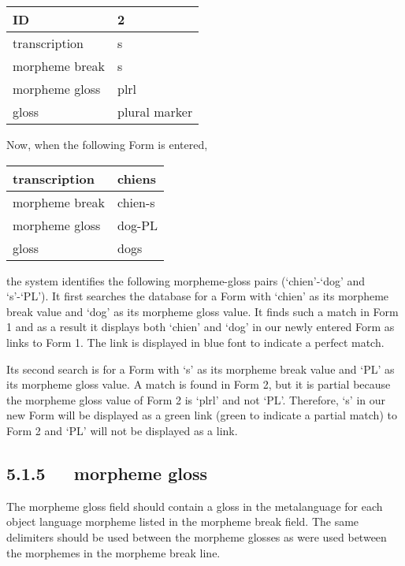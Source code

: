 \documentclass[letterpaper,10pt,english]{sphinxmanual}
\begin{document}
\begin{tabulary}{\linewidth}{|L|L|}
\hline

ID
 & 
2
\\\hline

transcription
 & 
s
\\\hline

morpheme break
 & 
s
\\\hline

morpheme gloss
 & 
plrl
\\\hline

gloss
 & 
plural marker
\\\hline
\end{tabulary}


Now, when the following Form is entered,

\begin{tabulary}{\linewidth}{|L|L|}
\hline

transcription
 & 
chiens
\\\hline

morpheme break
 & 
chien-s
\\\hline

morpheme gloss
 & 
dog-PL
\\\hline

gloss
 & 
dogs
\\\hline
\end{tabulary}


the system identifies the following morpheme-gloss pairs (`chien'-`dog' and
`s'-`PL').  It first searches the database for a Form with `chien' as its
morpheme break value and `dog' as its morpheme gloss value.  It finds such a
match in Form 1 and as a result it displays both `chien' and `dog' in our newly
entered Form as links to Form 1.  The link is displayed in blue font to indicate
a perfect match.

Its second search is for a Form with `s' as its morpheme break value and `PL' as
its morpheme gloss value.  A match is found in Form 2, but it is partial because
the morpheme gloss value of Form 2 is `plrl' and not `PL'.  Therefore, `s' in
our new Form will be displayed as a green link (green to indicate a partial
match) to Form 2 and `PL' will not be displayed as a link.


\subsection{5.1.5   morpheme gloss}
\label{documentation:morpheme-gloss}
The morpheme gloss field should contain a gloss in the metalanguage for each
object language morpheme listed in the morpheme break field.  The same
delimiters should be used between the morpheme glosses as were used between the
morphemes in the morpheme break line.
\end{document}
